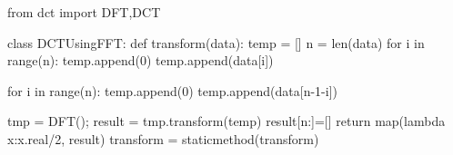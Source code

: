 \begin{python}
from dct import DFT,DCT

class DCTUsingFFT:
    def transform(data):
        temp = []
        n = len(data)
        for i in range(n):
            temp.append(0)
            temp.append(data[i])

        for i in range(n):
            temp.append(0)
            temp.append(data[n-1-i])

        tmp = DFT();
        result = tmp.transform(temp)
        result[n:]=[]
        return map(lambda x:x.real/2, result)
    transform = staticmethod(transform)
\end{python}
